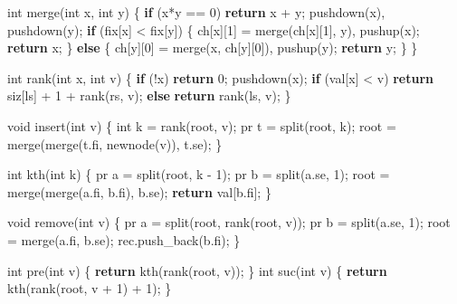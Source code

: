 \documentclass[
]{article}
\newenvironment{Shaded}{}{}
\newcommand{\ControlFlowTok}[1]{\textcolor[rgb]{0.00,0.44,0.13}{\textbf{#1}}}
\newcommand{\DataTypeTok}[1]{\textcolor[rgb]{0.56,0.13,0.00}{#1}}
\newcommand{\DecValTok}[1]{\textcolor[rgb]{0.25,0.63,0.44}{#1}}
\newcommand{\NormalTok}[1]{#1}
\begin{document}
\begin{Shaded}
\begin{Highlighting}[]
        \DataTypeTok{int}\NormalTok{ merge(}\DataTypeTok{int}\NormalTok{ x, }\DataTypeTok{int}\NormalTok{ y)}
\NormalTok{        \{}
            \ControlFlowTok{if}\NormalTok{ (x*y == }\DecValTok{0}\NormalTok{) }\ControlFlowTok{return}\NormalTok{ x + y;}
\NormalTok{            pushdown(x), pushdown(y);}
            \ControlFlowTok{if}\NormalTok{ (fix[x] \textless{} fix[y]) \{ ch[x][}\DecValTok{1}\NormalTok{] = merge(ch[x][}\DecValTok{1}\NormalTok{], y), pushup(x); }\ControlFlowTok{return}\NormalTok{ x; \}}
            \ControlFlowTok{else}\NormalTok{ \{ ch[y][}\DecValTok{0}\NormalTok{] = merge(x, ch[y][}\DecValTok{0}\NormalTok{]), pushup(y); }\ControlFlowTok{return}\NormalTok{ y; \}}
\NormalTok{        \}}

        \DataTypeTok{int}\NormalTok{ rank(}\DataTypeTok{int}\NormalTok{ x, }\DataTypeTok{int}\NormalTok{ v)}
\NormalTok{        \{}
            \ControlFlowTok{if}\NormalTok{ (!x) }\ControlFlowTok{return} \DecValTok{0}\NormalTok{;}
\NormalTok{            pushdown(x);}
            \ControlFlowTok{if}\NormalTok{ (val[x] \textless{} v) }\ControlFlowTok{return}\NormalTok{ siz[ls] + }\DecValTok{1}\NormalTok{ + rank(rs, v);}
            \ControlFlowTok{else} \ControlFlowTok{return}\NormalTok{ rank(ls, v);}
\NormalTok{        \}}

        \DataTypeTok{void}\NormalTok{ insert(}\DataTypeTok{int}\NormalTok{ v)}
\NormalTok{        \{}
            \DataTypeTok{int}\NormalTok{ k = rank(root, v);}
\NormalTok{            pr t = split(root, k);}
\NormalTok{            root = merge(merge(t.fi, newnode(v)), t.se);}
\NormalTok{        \}}

        \DataTypeTok{int}\NormalTok{ kth(}\DataTypeTok{int}\NormalTok{ k)}
\NormalTok{        \{}
\NormalTok{            pr a = split(root, k {-} }\DecValTok{1}\NormalTok{);}
\NormalTok{            pr b = split(a.se, }\DecValTok{1}\NormalTok{);}
\NormalTok{            root = merge(merge(a.fi, b.fi), b.se);}
            \ControlFlowTok{return}\NormalTok{ val[b.fi];}
\NormalTok{        \}}

        \DataTypeTok{void}\NormalTok{ remove(}\DataTypeTok{int}\NormalTok{ v)}
\NormalTok{        \{}
\NormalTok{            pr a = split(root, rank(root, v));}
\NormalTok{            pr b = split(a.se, }\DecValTok{1}\NormalTok{);}
\NormalTok{            root = merge(a.fi, b.se);}
\NormalTok{            rec.push\_back(b.fi);}
\NormalTok{        \}}

        \DataTypeTok{int}\NormalTok{ pre(}\DataTypeTok{int}\NormalTok{ v) \{ }\ControlFlowTok{return}\NormalTok{ kth(rank(root, v)); \}}
        \DataTypeTok{int}\NormalTok{ suc(}\DataTypeTok{int}\NormalTok{ v) \{ }\ControlFlowTok{return}\NormalTok{ kth(rank(root, v + }\DecValTok{1}\NormalTok{) + }\DecValTok{1}\NormalTok{); \}}


\end{Highlighting}
\end{Shaded}
\end{document}
